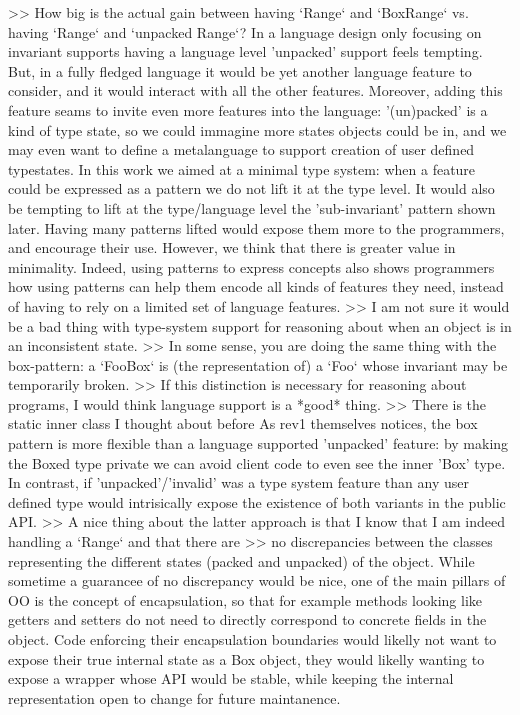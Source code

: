 >> How big is the actual gain between having `Range` and  `BoxRange` vs. having `Range` and `unpacked Range`?
In a language design only focusing on invariant supports having a language level 'unpacked' support feels tempting.
But, in a fully fledged language it would be yet another language feature to consider, and it would interact with all the other features.
Moreover, adding this feature seams to invite even more features into the language:
'(un)packed' is a kind of type state, so we could immagine more states objects could be in, and we may even want to define a metalanguage to support creation of user defined typestates.
In this work we aimed at a minimal type system: when a feature could be expressed as a pattern we do not lift it at the type level.
It would also be tempting to lift at the type/language level the 'sub-invariant' pattern shown later.
Having many patterns lifted would expose them more to the programmers, and encourage their use.
However, we think that there is greater value in minimality.
Indeed, using patterns to express concepts also shows programmers how using patterns can help them encode all kinds of features they need, instead of having to rely on a limited set of language features.
>> I am not sure it would be a bad thing with type-system support for reasoning about when an object is in an inconsistent state.
>> In some sense, you are doing the same thing with the box-pattern: a `FooBox` is (the representation of) a `Foo` whose invariant may be temporarily broken.
>> If this distinction is necessary for reasoning about programs, I would think language support is a *good* thing.
>> There is the static inner class I thought about before
As rev1 themselves notices, the box pattern is more flexible than a language supported 'unpacked' feature:
by making the Boxed type private we can avoid client code to even see the inner 'Box' type. 
In contrast, if 'unpacked'/'invalid' was a type system feature than any user defined type would intrisically expose the existence of both variants in the public API.
>> A nice thing  about the latter approach is that I know that I am indeed  handling a `Range` and that there are
>> no discrepancies between the classes representing the different states (packed and  unpacked) of the object.
While sometime a guarancee of no discrepancy would be nice, one of the main pillars of OO is the concept of encapsulation, so that
for example methods looking like getters and setters do not need to directly correspond to concrete fields in the object.
Code enforcing their encapsulation boundaries would likelly not want to expose their true internal state as a Box object, they would likelly wanting to expose a wrapper whose
API would be stable, while keeping the internal representation open to change for future maintanence.

